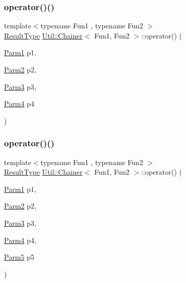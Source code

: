 \subsubsection{\texorpdfstring{operator()()}{operator()()}\hspace{0.1cm}{\footnotesize\ttfamily [15/18]}}
{\footnotesize\ttfamily template$<$typename Fun1 , typename Fun2 $>$ \\
\mbox{\hyperlink{classUtil_1_1Chainer_a2c8d88a77b8ba93eb915dc799ddafbb9}{Result\+Type}} \mbox{\hyperlink{classUtil_1_1Chainer}{Util\+::\+Chainer}}$<$ Fun1, Fun2 $>$\+::operator() (\begin{DoxyParamCaption}\item[{\mbox{\hyperlink{classUtil_1_1Chainer_a3e09b2267dabdd8d12070b09c47749c6}{Parm1}}}]{p1,  }\item[{\mbox{\hyperlink{classUtil_1_1Chainer_a1bfb0e8f35679278c85d232a74a107ff}{Parm2}}}]{p2,  }\item[{\mbox{\hyperlink{classUtil_1_1Chainer_ac28811d7153f7b7cf837f7b8626436c8}{Parm3}}}]{p3,  }\item[{\mbox{\hyperlink{classUtil_1_1Chainer_a82e756f3083e3883a05644425474f789}{Parm4}}}]{p4 }\end{DoxyParamCaption})\hspace{0.3cm}{\ttfamily [inline]}}

\mbox{\label{classUtil_1_1Chainer_a3aee5b0f14ad8a15d167dd319019a01a}} 
\subsubsection{\texorpdfstring{operator()()}{operator()()}\hspace{0.1cm}{\footnotesize\ttfamily [16/18]}}
{\footnotesize\ttfamily template$<$typename Fun1 , typename Fun2 $>$ \\
\mbox{\hyperlink{classUtil_1_1Chainer_a2c8d88a77b8ba93eb915dc799ddafbb9}{Result\+Type}} \mbox{\hyperlink{classUtil_1_1Chainer}{Util\+::\+Chainer}}$<$ Fun1, Fun2 $>$\+::operator() (\begin{DoxyParamCaption}\item[{\mbox{\hyperlink{classUtil_1_1Chainer_a3e09b2267dabdd8d12070b09c47749c6}{Parm1}}}]{p1,  }\item[{\mbox{\hyperlink{classUtil_1_1Chainer_a1bfb0e8f35679278c85d232a74a107ff}{Parm2}}}]{p2,  }\item[{\mbox{\hyperlink{classUtil_1_1Chainer_ac28811d7153f7b7cf837f7b8626436c8}{Parm3}}}]{p3,  }\item[{\mbox{\hyperlink{classUtil_1_1Chainer_a82e756f3083e3883a05644425474f789}{Parm4}}}]{p4,  }\item[{\mbox{\hyperlink{classUtil_1_1Chainer_ac5fdddd223aac1cfb37abd6d681ddf69}{Parm5}}}]{p5 }\end{DoxyParamCaption})\hspace{0.3cm}{\ttfamily [inline]}}

